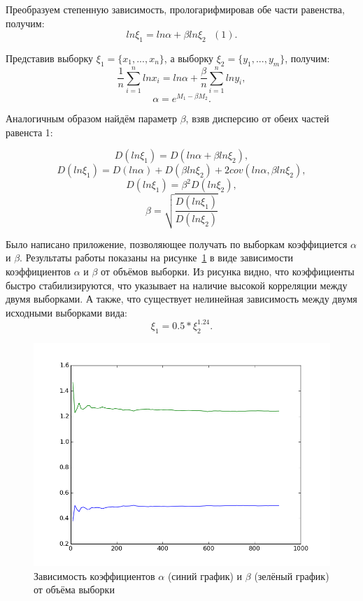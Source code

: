 \documentclass[12pt,a4paper,oneside]{extarticle}
\begin{document}
    Преобразуем степенную зависимость, прологарифмировав обе части равенства, получим: $$ln \xi_1 = ln \alpha + \beta ln \xi_2~~~ (1).$$


       
    Представив выборку $\xi_1 = \{x_1, . . . , x_n\}$, а выборку $\xi_2 = \{y_1, . . . , y_m\}$, получим:
    $$\frac{1}{n}\sum_{i=1}^{n} ln x_i = ln \alpha + \frac{\beta}{n} \sum_{i=1}^{n} ln y_i,$$
    $$\alpha = e^{M_1-\beta M_2}.$$

    Аналогичным образом найдём параметр $\beta$, взяв дисперсию от обеих частей равенста 1:

    $$D (ln \xi_1) = D(ln \alpha + \beta ln \xi_2),$$
    $$D (ln \xi_1) = D(ln \alpha) + D(\beta ln \xi_2) + 2 cov(ln \alpha, \beta ln \xi_2),$$
    $$D (ln \xi_1) = \beta^2 D(ln \xi_2), $$
    $$\beta = \sqrt{\frac{D (ln \xi_1)}{D (ln \xi_2)}}$$

    Было написано приложение, позволяющее получать по выборкам коэффициется $\alpha$ и $\beta$. Результаты работы показаны на рисунке~\ref{pic:tree} в виде зависимости коэффициентов $\alpha$ и $\beta$ от объёмов выборки. Из рисунка видно, что коэффициенты быстро стабилизируются, что указывает на наличие высокой корреляции между двумя выборками. А также, что существует нелинейная зависимость между двумя исходными выборками вида: $$\xi_1 = 0.5*\xi_2^{1.24}.$$ 

    \begin{figure}[h!]
        \center
        \includegraphics[scale=0.7]{../figure_1.png}
        \caption{Зависимость коэффициентов $\alpha$ (синий график) и $\beta$ (зелёный график) от объёма выборки}
        \label{pic:tree}
    \end{figure}

    
\end{document}
